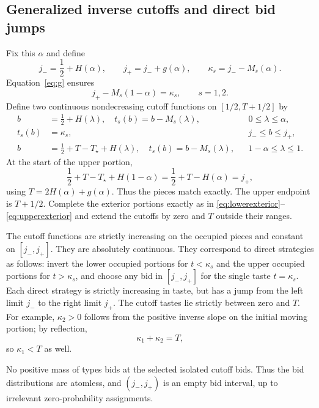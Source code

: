 \documentclass[11pt,a4paper]{article}
\numberwithin{equation}{section}
\theoremstyle{definition}
\theoremstyle{remark}
\newcommand{\Ts}{T_\star}
\begin{document}
\subsection{Generalized inverse cutoffs and direct bid jumps}
Fix this $\alpha$ and define
\begin{equation}
\label{eq:gapbounds}
 j_- =\frac12+H(\alpha),\qquad
 j_+=j_-+g(\alpha),\qquad
 \kappa_s=j_--M_s(\alpha).
\end{equation}
Equation~\eqref{eq:g} ensures
\begin{equation}
\label{eq:jumpmatch}
 j_+-M_s(1-\alpha)=\kappa_s,\qquad s=1,2.
\end{equation}
Define two continuous nondecreasing cutoff functions on $[1/2,T+1/2]$ by
\begin{align}
 b&=\frac12+H(\lambda),\quad
 t_s(b)=b-M_s(\lambda),
 &&0\le\lambda\le\alpha,\label{eq:jumplower}\\
 t_s(b)&=\kappa_s,
 &&j_-\le b\le j_+,\label{eq:jumpgap}\\
 b&=\frac12+T-\Ts+H(\lambda),\quad
 t_s(b)=b-M_s(\lambda),
 &&1-\alpha\le\lambda\le1.\label{eq:jumpupper}
\end{align}
At the start of the upper portion,
\[
 \frac12+T-\Ts+H(1-\alpha)
 =\frac12+T-H(\alpha)=j_+,
\]
using $T=2H(\alpha)+g(\alpha)$. Thus the pieces match exactly. The upper endpoint is $T+1/2$. Complete the exterior portions exactly as in \eqref{eq:lowerexterior}--\eqref{eq:upperexterior} and extend the cutoffs by zero and $T$ outside their ranges.

The cutoff functions are strictly increasing on the occupied pieces and constant on $[j_-,j_+]$. They are absolutely continuous. They correspond to direct strategies as follows: invert the lower occupied portions for $t<\kappa_s$ and the upper occupied portions for $t>\kappa_s$, and choose any bid in $[j_-,j_+]$ for the single taste $t=\kappa_s$. Each direct strategy is strictly increasing in taste, but has a jump from the left limit $j_-$ to the right limit $j_+$. The cutoff tastes lie strictly between zero and $T$. For example, $\kappa_2>0$ follows from the positive inverse slope on the initial moving portion; by reflection,
\begin{equation}
\label{eq:cutoffsum}
 \kappa_1+\kappa_2=T,
\end{equation}
so $\kappa_1<T$ as well.

No positive mass of types bids at the selected isolated cutoff bids. Thus the bid distributions are atomless, and $(j_-,j_+)$ is an empty bid interval, up to irrelevant zero-probability assignments.
\end{document}

